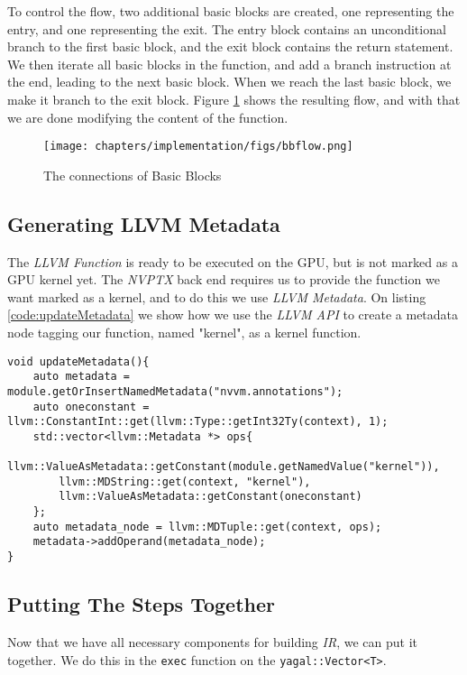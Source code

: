 To control the flow, two additional basic blocks are created, one representing the entry, and one representing the exit. The entry block contains an unconditional branch to the first basic block, and the exit block contains the return statement. We then iterate all basic blocks in the function, and add a branch instruction at the end, leading to the next basic block. When we reach the last basic block, we make it branch to the exit block. Figure \ref{fig:bbflow} shows the resulting flow, and with that we are done modifying the content of the function.

\begin{figure}[!htb]
    \center
    \label{fig:bbflow}
    \texttt{[image: chapters/implementation/figs/bbflow.png]}
    \caption{The connections of Basic Blocks}
\end{figure}

\subsection{Generating LLVM Metadata} \label{sec:metadata}
The \textit{LLVM Function} is ready to be executed on the GPU, but is not marked as a GPU kernel yet. The \textit{NVPTX} back end requires us to provide the function we want marked as a kernel, and to do this we use \textit{LLVM Metadata}. On listing \ref{code:updateMetadata} we show how we use the \textit{LLVM API} to create a metadata node tagging our function, named "kernel", as a kernel function.

\begin{lstlisting}[caption={The updateMetadata function}, label={code:updateMetadata}]
void updateMetadata(){
    auto metadata = module.getOrInsertNamedMetadata("nvvm.annotations");
    auto oneconstant = llvm::ConstantInt::get(llvm::Type::getInt32Ty(context), 1);
    std::vector<llvm::Metadata *> ops{
        llvm::ValueAsMetadata::getConstant(module.getNamedValue("kernel")),
        llvm::MDString::get(context, "kernel"),
        llvm::ValueAsMetadata::getConstant(oneconstant)
    };
    auto metadata_node = llvm::MDTuple::get(context, ops); 
    metadata->addOperand(metadata_node);
}
\end{lstlisting}

\subsection{Putting The Steps Together}\label{cha:puttingStepsTogether}
Now that we have all necessary components for building \textit{IR}, we can put it together. We do this in the \texttt{exec} function on the \texttt{yagal::Vector<T>}.


